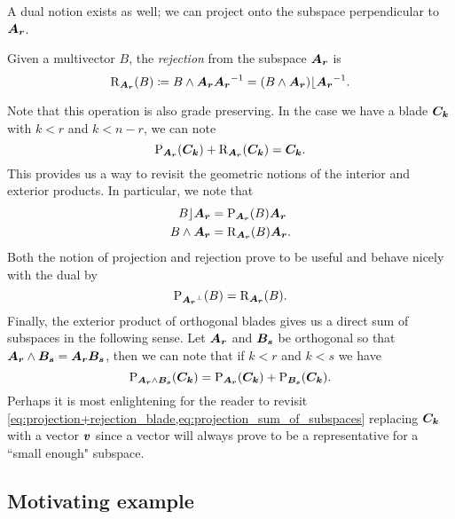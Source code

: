 A dual notion exists as well; we can project onto the subspace perpendicular to $\boldsymbol{A_r}$.
\begin{definition}
Given a multivector $B$, the \emph{rejection} from the subspace $\boldsymbol{A_r}$ is
\begin{equation}
\label{eq:rejection}
\operatorname{R}_{\boldsymbol{A_r}}(B) \coloneqq B \wedge \boldsymbol{A_r} \boldsymbol{A_r}^{-1} = (B\wedge \boldsymbol{A_r})\lfloor \boldsymbol{A_r}^{-1}.
\end{equation}
\end{definition}
Note that this operation is also grade preserving. In the case we have a blade $\boldsymbol{C_k}$ with $k<r$ and $k<n-r$, we can note
\begin{equation}
\label{eq:projection+rejection_blade}
\operatorname{P}_{\boldsymbol{A_r}}(\boldsymbol{C_k}) + \operatorname{R}_{\boldsymbol{A_r}}(\boldsymbol{C_k}) = \boldsymbol{C_k}.
\end{equation}
This provides us a way to revisit the geometric notions of the interior and exterior products. In particular, we note that
\begin{align}
    B \rfloor \boldsymbol{A_r} &= \operatorname{P}_{\boldsymbol{A_r}} (B) \boldsymbol{A_r}\\
    B \wedge \boldsymbol{A_r} &= \operatorname{R}_{\boldsymbol{A_r}}(B) \boldsymbol{A_r}.
\end{align}
Both the notion of projection and rejection prove to be useful and behave nicely with the dual by
\begin{equation}
\label{eq:projection_rejection_duality}
\operatorname{P}_{\boldsymbol{A_r}^\perp}(B) = \operatorname{R}_{\boldsymbol{A_r}}(B).
\end{equation}
Finally, the exterior product of orthogonal blades gives us a direct sum of subspaces in the following sense. Let $\boldsymbol{A_r}$ and $\boldsymbol{B_s}$ be orthogonal so that $\boldsymbol{A_r}\wedge \boldsymbol{B_s}=\boldsymbol{A_r}\boldsymbol{B_s}$, then we can note that if $k<r$ and $k<s$ we have
\begin{equation}
\label{eq:projection_sum_of_subspaces}
    \operatorname{P}_{\boldsymbol{A_r}\wedge \boldsymbol{B_s}} (\boldsymbol{C_k}) = \operatorname{P}_{\boldsymbol{A_r}}(\boldsymbol{C_k}) + \operatorname{P}_{\boldsymbol{B_s}}(\boldsymbol{C_k}).
\end{equation}
Perhaps it is most enlightening for the reader to revisit \cref{eq:projection+rejection_blade,eq:projection_sum_of_subspaces} replacing $\boldsymbol{C_k}$ with a vector $\boldsymbol{v}$ since a vector will always prove to be a representative for a ``small enough" subspace.


\subsection{Motivating example}
\label{subsec:motivating_example}

